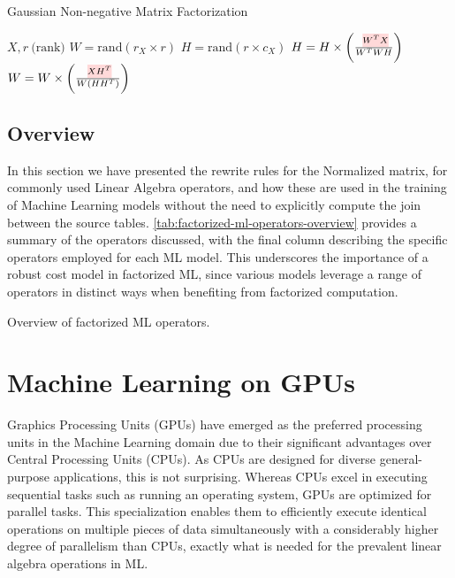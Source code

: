 \begin{algorithm}[ht]
  \caption[Gaussian NMF]{Gaussian Non-negative Matrix Factorization
    ~\cite{morpheus}}\label{alg:gaussian-nmf}
  \begin{algorithmic}
    \Require $X, r\ \text{(rank)}$
    \State $W = \text{rand}(r_X \times r)$ 
    \State $H = \text{rand}(r \times c_X)$ 
    \State $H = H \times \left(\frac{\text{\red{$W^T X$}}}{W^T W H}\right)$
    \State $W = W \times \left(\frac{\text{\red{$X H^T$}}}{W(H H^T)}\right)$
    \EndFor
  \end{algorithmic}
\end{algorithm}


\subsection{Overview}
\label{subsec:factorized-ml-summary}
In this section we have presented the rewrite rules for the Normalized matrix, for commonly used Linear Algebra operators, and how these are used in the training of Machine Learning models without the need to explicitly compute the join between the source tables. \autoref{tab:factorized-ml-operators-overview}  provides a summary of the operators discussed, with the final column describing the specific operators employed for each ML model. This underscores the importance of a robust cost model in factorized ML, since various models leverage a range of operators in distinct ways when benefiting from factorized computation.

\begin{table}[ht]
  \small
  \resizebox{\textwidth}{!}{%
    }
  \caption{Overview of factorized ML operators.}
  \label{tab:factorized-ml-operators-overview}
\end{table}

\section{Machine Learning on GPUs}
\label{sec:2-ml-on-gpu}
Graphics Processing Units (GPUs) have emerged as the preferred processing units in the Machine Learning domain due to their significant advantages over Central Processing Units (CPUs). As CPUs are designed for diverse general-purpose applications, this is not surprising. Whereas CPUs excel in executing sequential tasks such as running an operating system, GPUs are optimized for parallel tasks. This specialization enables them to efficiently execute identical operations on multiple pieces of data simultaneously with a considerably higher degree of parallelism than CPUs, exactly what is needed for the prevalent linear algebra operations in ML.

